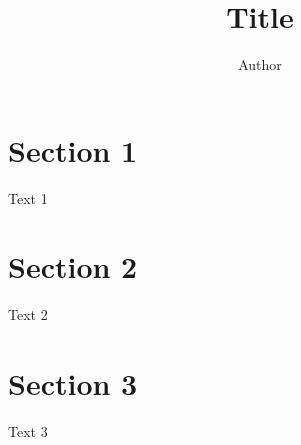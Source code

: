 \documentclass[journal]{combine}
\begin{document}
	
	\title{Title}
	\author{Author}
	\maketitle

	\newpage

	\tableofcontents

	\newpage
	
	\section{Section 1}
		Text 1
	\newpage
	\section{Section 2}
		Text 2
	\newpage
	\section{Section 3}
		Text 3
\end{document}
